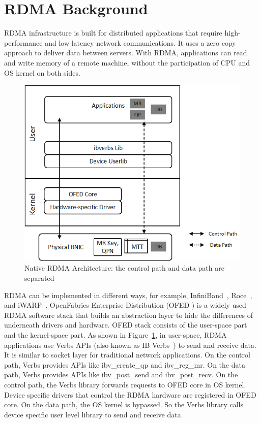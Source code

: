 \section{RDMA Background} \label{background}
RDMA infrastructure is built for distributed applications that require high-performance and low latency network communications. It uses a zero copy approach to deliver data between servers. With RDMA, applications can read and write memory of a remote machine, without the participation of CPU and OS kernel on both sides.

\begin{figure}[!ht]
	\centering
	\includegraphics[width=0.8\linewidth]{images/rdma-feat.png}
	\caption{Native RDMA Architecture: the control path and data path are separated}
	\label{fig:rdma-feat}
\end{figure}

RDMA can be implemented in different ways, for example, InfiniBand~\cite{infiniband}, Roce~\cite{roce}, and iWARP~\cite{iwarp}.
OpenFabrics Enterprise Distribution (OFED \cite{ofed}) is a widely used RDMA software stack that builds an abstraction layer to hide the differences of underneath drivers and hardware.
OFED stack consists of the user-space part and the kernel-space part.
As shown in Figure~\ref{fig:rdma-feat}, in user-space, RDMA applications use Verbs APIs (also known as IB Verbs~\cite{verbs}) to send and receive data. It is similar to socket layer for traditional network applications. On the control path, Verbs provides APIs like ibv\_create\_qp and ibv\_reg\_mr. On the data path, Verbs provides APIs like ibv\_post\_send and ibv\_post\_recv. On the control path, the Verbs library forwards requests to OFED core in OS kernel. Device specific drivers that control the RDMA hardware are registered in OFED core. On the data path, the OS kernel is bypassed. So the Verbs library calls device specific user level library to send and receive data.

